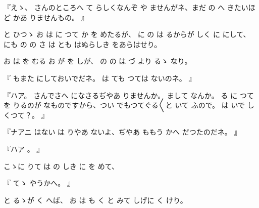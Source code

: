 『えゝ、
さんのところへ
て
らしくなんぞ
や
ませんがネ、まだ
の
へ
きたいほど
かあ
りませんもの。
』

と
ひつゝ
お
は
に
つて
か
を
めたるが、
に
の
は
るからが
しく
に
にして、
にも
の
の
さ
は
とも
はぬらしき
をあらはせり。

お
は
を
むる
お
が
を
しが、
の
の
は
づ
より
るゝ
なり。

『
もまた
にしておいでだネ。
は
ても
つては
ないのネ。
』

『ハア。
さんでさへ
になさるぢやあ
りませんか。
まして
なんか。
る
に
つて
を
りるのが
なものですから、つい
でもつてぐる〳〵と
いて
ふので。
は
いで
しくつて？。
』

『ナアニ
はない
は
りやあ
ないよ、ぢやあ
ももう
かへ
だつたのだネ。
』

『ハア
。
』

こゝに
りて
は
の
しき
に
を
めて、

『
てゝ
やうかへ。
』

と
るゝが
く
へば、
お
は
も
く
と
みて
しげに
く
けり。

